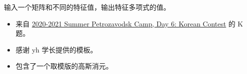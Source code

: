 \noindent 输入一个矩阵和不同的特征值，输出特征多项式的值。

\begin{itemize}
    \item 来自 \href{https://codeforces.com/group/TBxCTUW7hQ/contest/320930}{2020-2021 Summer Petrozavodsk Camp, Day 6: Korean Contest} 的 K 题。
    \item 感谢 yh 学长提供的模板。
    \item 包含了一个取模版的高斯消元。
\end{itemize}